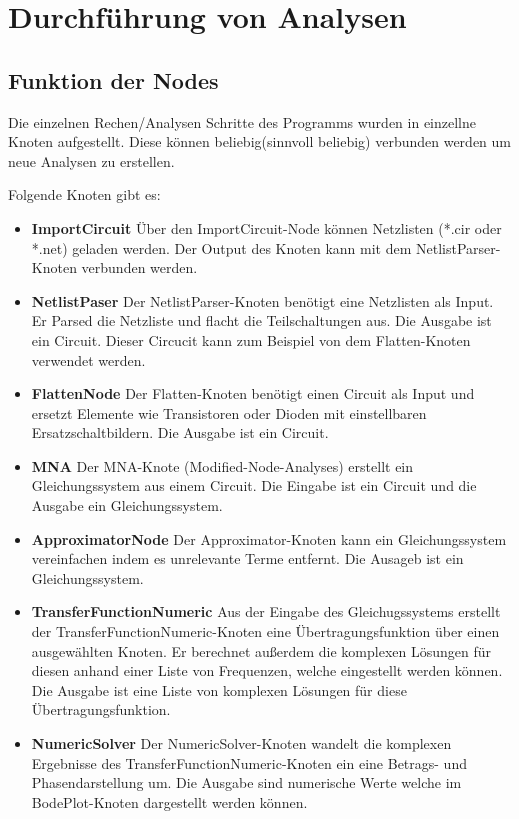 \section{Durchführung von Analysen}
\subsection{Funktion der Nodes}
Die einzelnen Rechen/Analysen Schritte des Programms wurden in einzellne Knoten aufgestellt. Diese können beliebig(sinnvoll beliebig) verbunden werden um neue Analysen zu erstellen.

Folgende Knoten gibt es:
\begin{itemize}
    \item \textbf{ImportCircuit} Über den ImportCircuit-Node können Netzlisten (*.cir oder *.net) geladen werden. Der Output des Knoten kann mit dem NetlistParser-Knoten verbunden werden.
    \item \textbf{NetlistPaser} Der NetlistParser-Knoten benötigt eine Netzlisten als Input. Er Parsed die Netzliste und flacht die Teilschaltungen aus. Die Ausgabe ist ein Circuit. Dieser Circucit kann zum Beispiel von dem Flatten-Knoten verwendet werden.
    \item \textbf{FlattenNode} Der Flatten-Knoten benötigt einen Circuit als Input und ersetzt Elemente wie Transistoren oder Dioden mit einstellbaren Ersatzschaltbildern. Die Ausgabe ist ein Circuit.
    \item \textbf{MNA} Der MNA-Knote (Modified-Node-Analyses) erstellt ein Gleichungssystem aus einem Circuit. Die Eingabe ist ein Circuit und die Ausgabe ein Gleichungssystem.
    \item \textbf{ApproximatorNode} Der Approximator-Knoten kann ein Gleichungssystem vereinfachen indem es unrelevante Terme entfernt. Die Ausageb ist ein Gleichungssystem.
    \item \textbf{TransferFunctionNumeric} Aus der Eingabe des Gleichugssystems erstellt der TransferFunctionNumeric-Knoten eine Übertragungsfunktion über einen ausgewählten Knoten. Er berechnet außerdem die komplexen Lösungen für diesen anhand einer Liste von Frequenzen, welche eingestellt werden können. Die Ausgabe ist eine Liste von komplexen Lösungen für diese Übertragungsfunktion.
    \item \textbf{NumericSolver} Der NumericSolver-Knoten wandelt die komplexen Ergebnisse des TransferFunctionNumeric-Knoten ein eine Betrags- und Phasendarstellung um. Die Ausgabe sind numerische Werte welche im BodePlot-Knoten dargestellt werden können.

\end{itemize}
